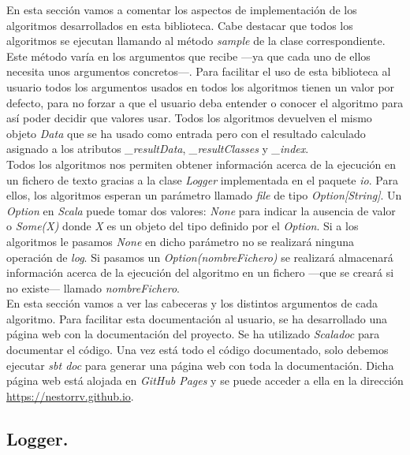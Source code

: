 En esta sección vamos a comentar los aspectos de implementación de los algoritmos desarrollados en esta biblioteca. Cabe destacar que todos los algoritmos se ejecutan llamando al método \textit{sample} de la clase correspondiente. Este método varía en los argumentos que recibe —ya que cada uno de ellos necesita unos argumentos concretos—. Para facilitar el uso de esta biblioteca al usuario todos los argumentos usados en todos los algoritmos tienen un valor por defecto, para no forzar a que el usuario deba entender o conocer el algoritmo para así poder decidir que valores usar. Todos los algoritmos devuelven el mismo objeto \textit{Data} que se ha usado como entrada pero con el resultado calculado asignado a los atributos \textit{\_resultData}, \textit{\_resultClasses} y \textit{\_index}. \\

Todos los algoritmos nos permiten obtener información acerca de la ejecución en un fichero de texto gracias a la clase \textit{Logger} implementada en el paquete \textit{io}. Para ellos, los algoritmos esperan un parámetro llamado \textit{file} de tipo \textit{Option[String]}. Un \textit{Option} en \textit{Scala} puede tomar dos valores: \textit{None} para indicar la ausencia de valor o \textit{Some(X)} donde \textit{X} es un objeto del tipo definido por el \textit{Option}. Si a los algoritmos le pasamos \textit{None} en dicho parámetro no se realizará ninguna operación de \textit{log}. Si pasamos un \textit{Option(nombreFichero)} se realizará almacenará información acerca de la ejecución del algoritmo en un fichero —que se creará si no existe— llamado \textit{nombreFichero}. \\

En esta sección vamos a ver las cabeceras y los distintos argumentos de cada algoritmo. Para facilitar esta documentación al usuario, se ha desarrollado una página web con la documentación del proyecto. Se ha utilizado \textit{Scaladoc} \cite{scaladoc} para documentar el código. Una vez está todo el código documentado, solo debemos ejecutar \textit{sbt doc} para generar una página web con toda la documentación. Dicha página web está alojada en \textit{GitHub Pages} \cite{github-pages} y se puede acceder a ella en la dirección \href{https://nestorrv.github.io}{https://nestorrv.github.io}.

\subsection{Logger.} \label{sec:logger}

